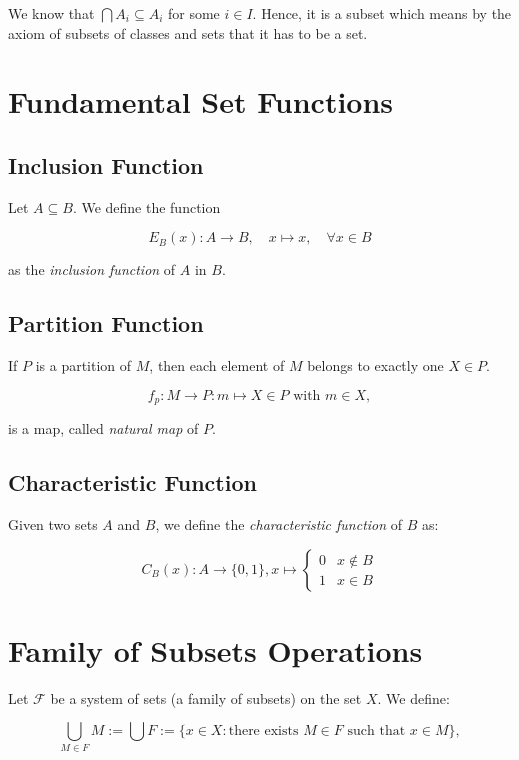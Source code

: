We know that \(\bigcap A_i \subseteq A_i\) for some \(i \in I\). Hence, it is a subset which means by the axiom of subsets of classes and sets
that it has to be a set.

\QED

\section{Fundamental Set Functions}

\subsection{Inclusion Function}

Let \(A \subseteq B\). We define the function

\[
	E_{B}(x): A \to B, \quad x \mapsto x, \quad \forall x \in B
\]

as the \emph{inclusion function} of \(A\) in \(B\).

\subsection{Partition Function}

If \(P\) is a partition of \(M\), then each element of \(M\) belongs to exactly one \(X \in P\).

\[
	f_p : M \to P : m \mapsto X \in P \text{ with }m \in X,
\]

is a map, called \emph{natural map} of \(P\).

\subsection{Characteristic Function}

Given two sets \(A\) and \(B\), we define the \emph{characteristic function} of \(B\) as:

\[
	C_{B}(x): A \to \{0, 1\}, x \mapsto \begin{cases}
		0 & x \notin B \\
		1 & x  \in B
	\end{cases}
\]

\section{Family of Subsets Operations}

Let \(\mathscr{F}\) be a system of sets (a family of subsets) on the set \(X\). We define:

\[
	\bigcup_{M \in F} M := \bigcup F := \{ x \in X : \text{there exists } M \in F \text{ such that } x
	\in M \} ,
\]

